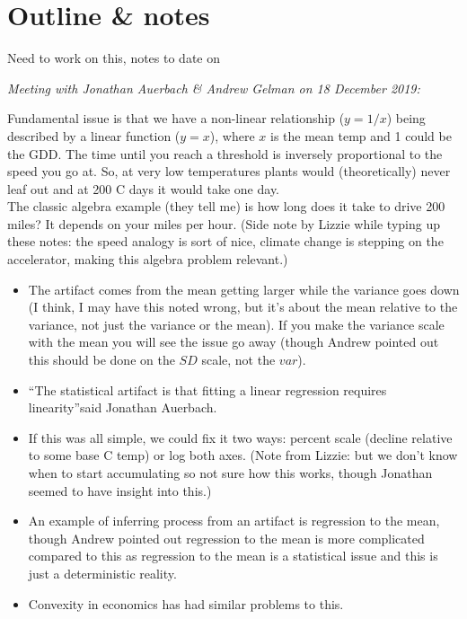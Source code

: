 \documentclass[11pt,letter]{article}
\begin{document}
\section{Outline \& notes}

Need to work on this, notes to date on %

\emph{Meeting with Jonathan Auerbach \& Andrew Gelman on 18 December 2019:} 

Fundamental issue is that we have a non-linear relationship ($y=1/x$) being described by a linear function ($y=x$), where $x$ is the mean temp and 1 could be the GDD. The time until you reach a threshold is inversely proportional to the speed you go at. So, at very low temperatures plants would (theoretically) never leaf out and at 200 C days it would take one day. \\

The classic algebra example (they tell me) is how long does it take to drive 200 miles? It depends on your miles per hour. (Side note by Lizzie while typing up these notes: the speed analogy is sort of nice, climate change is stepping on the accelerator, making this algebra problem relevant.)

\begin{itemize}
\item The artifact comes from the mean getting larger while the variance goes down (I think, I may have this noted wrong, but it's about the mean relative to the variance, not just the variance or the mean). If you make the variance scale with the mean you will see the issue go away (though Andrew pointed out this should be done on the $SD$ scale, not the $var$).
\item ``The statistical artifact is that fitting a linear regression requires linearity''said  Jonathan Auerbach.
\item If this was all simple, we could fix it two ways: percent scale (decline relative to some base C temp) or log both axes. (Note from Lizzie: but we don't know when to start accumulating so not sure how this works, though Jonathan seemed to have insight into this.)
\item An example of inferring process from an artifact is regression to the mean, though Andrew pointed out regression to the mean is more complicated compared to this as regression to the mean is a statistical issue and this is just a deterministic reality. 
\item Convexity in economics has had similar problems to this. 
\end{itemize}
\end{document}
